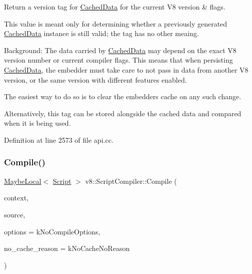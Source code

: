Return a version tag for \mbox{\hyperlink{structv8_1_1ScriptCompiler_1_1CachedData}{Cached\+Data}} for the current V8 version \& flags.

This value is meant only for determining whether a previously generated \mbox{\hyperlink{structv8_1_1ScriptCompiler_1_1CachedData}{Cached\+Data}} instance is still valid; the tag has no other meaing.

Background\+: The data carried by \mbox{\hyperlink{structv8_1_1ScriptCompiler_1_1CachedData}{Cached\+Data}} may depend on the exact V8 version number or current compiler flags. This means that when persisting \mbox{\hyperlink{structv8_1_1ScriptCompiler_1_1CachedData}{Cached\+Data}}, the embedder must take care to not pass in data from another V8 version, or the same version with different features enabled.

The easiest way to do so is to clear the embedder\textquotesingle{}s cache on any such change.

Alternatively, this tag can be stored alongside the cached data and compared when it is being used. 

Definition at line 2573 of file api.\+cc.

\mbox{\label{classv8_1_1ScriptCompiler_a3df9c0af702e46303ded03e84fc5e519}} 
\subsubsection{\texorpdfstring{Compile()}{Compile()}\hspace{0.1cm}{\footnotesize\ttfamily [1/2]}}
{\footnotesize\ttfamily \mbox{\hyperlink{classv8_1_1MaybeLocal}{Maybe\+Local}}$<$ \mbox{\hyperlink{classv8_1_1Script}{Script}} $>$ v8\+::\+Script\+Compiler\+::\+Compile (\begin{DoxyParamCaption}\item[{\mbox{\hyperlink{classv8_1_1Local}{Local}}$<$ Context $>$}]{context,  }\item[{\mbox{\hyperlink{classv8_1_1ScriptCompiler_1_1Source}{Source}} $\ast$}]{source,  }\item[{Compile\+Options}]{options = {\ttfamily kNoCompileOptions},  }\item[{\mbox{\hyperlink{classv8_1_1ScriptCompiler_a7f13fa15484cfc500ae51927756e0d60}{No\+Cache\+Reason}}}]{no\+\_\+cache\+\_\+reason = {\ttfamily kNoCacheNoReason} }\end{DoxyParamCaption})\hspace{0.3cm}{\ttfamily [static]}}

